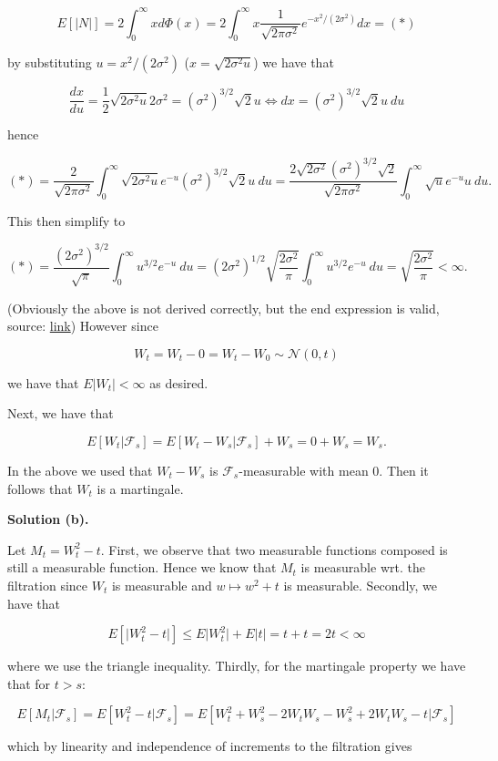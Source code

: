 \documentclass[
]{article}
\begin{document}
\[E[\vert N\vert]=2\int_{0}^\infty xd\Phi(x)=2\int_{0}^\infty x\frac{1}{\sqrt{2\pi\sigma^2}}e^{-x^2/(2\sigma^2)}dx=(*)\]

by substituting \(u=x^2/(2\sigma^2)\) (\(x=\sqrt{2\sigma^2u}\)) we have
that

\[\frac{dx}{du}=\frac{1}{2}\sqrt{2\sigma^2u}2\sigma^2=(\sigma^2)^{3/2}\sqrt{2}u\iff dx=(\sigma^2)^{3/2}\sqrt{2}u\ du\]

hence

\[(*)=\frac{2}{\sqrt{2\pi\sigma^2}}\int_0^{\infty}\sqrt{2\sigma^2u}e^{-u}(\sigma^2)^{3/2}\sqrt{2}u\ du=\frac{2\sqrt{2\sigma^2}(\sigma^2)^{3/2}\sqrt{2}}{\sqrt{2\pi\sigma^2}}\int_0^{\infty}\sqrt{u}e^{-u}u\ du.\]

This then simplify to

\[(*)=\frac{(2\sigma^2)^{3/2}}{\sqrt{\pi}}\int_0^{\infty}u^{3/2}e^{-u}\ du=(2\sigma^2)^{1/2}\sqrt{\frac{2\sigma^2}{\pi}}\int_0^{\infty}u^{3/2}e^{-u}\ du=\sqrt{\frac{2\sigma^2}{\pi}}<\infty.\]

(Obviously the above is not derived correctly, but the end expression is
valid, source: \href{https://arxiv.org/pdf/1402.3559.pdf}{link}) However
since

\[W_t=W_t-0=W_t-W_0\sim\mathcal{N}(0,t)\]

we have that \(E\vert W_t\vert<\infty\) as desired.

Next, we have that

\[E[W_t\vert \mathcal{F}_s]=E[W_t-W_s\vert\mathcal{F}_s]+W_s=0+W_s=W_s.\]

In the above we used that \(W_t-W_s\) is \(\mathcal{F}_s\)-measurable
with mean 0. Then it follows that \(W_t\) is a martingale.

\textbf{Solution (b).}

Let \(M_t=W_t^2-t\). First, we observe that two measurable functions
composed is still a measurable function. Hence we know that \(M_t\) is
measurable wrt. the filtration since \(W_t\) is measurable and
\(w\mapsto w^2+t\) is measurable. Secondly, we have that

\[E[\vert W_t^2-t\vert]\le E\vert W_t^2\vert +E\vert t\vert=t+t=2t<\infty\]

where we use the triangle inequality. Thirdly, for the martingale
property we have that for \(t>s\):

\[E[M_t\vert \mathcal{F}_s]=E[W_t^2-t\vert \mathcal{F}_s]=E[W_t^2+W_s^2-2W_tW_s-W_s^2+2W_tW_s-t\vert \mathcal{F}_s]\]

which by linearity and independence of increments to the filtration
gives
\end{document}
